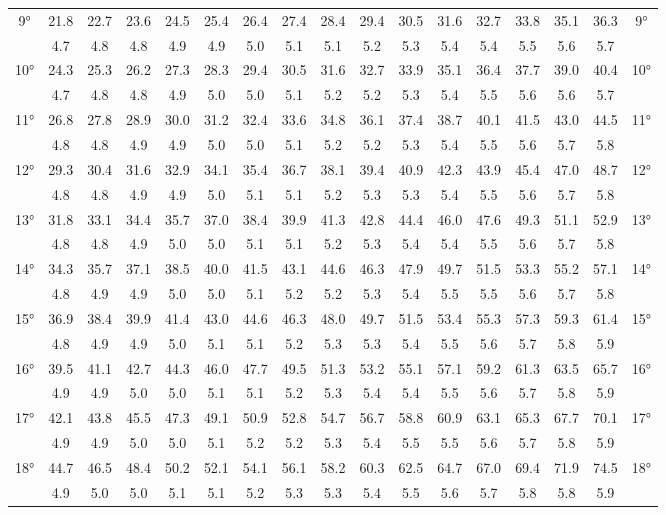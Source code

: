 \begin{footnotesize}
\begin{tabular}{c || c | c | c | c | c | c | c | c | c | c | c | c | c | c | c || c}
		\multirow{2}{*}{9°}&21.8&22.7&23.6&24.5&25.4&26.4&27.4&28.4&29.4&30.5&31.6&32.7&33.8&35.1&36.3&\multirow{2}{*}{9°}\\ \space&4.7&4.8&4.8&4.9&4.9&5.0&5.1&5.1&5.2&5.3&5.4&5.4&5.5&5.6&5.7&\space\\\hline
		\multirow{2}{*}{10°}&24.3&25.3&26.2&27.3&28.3&29.4&30.5&31.6&32.7&33.9&35.1&36.4&37.7&39.0&40.4&\multirow{2}{*}{10°}\\ \space&4.7&4.8&4.8&4.9&5.0&5.0&5.1&5.2&5.2&5.3&5.4&5.5&5.6&5.6&5.7&\space\\\hline
		\multirow{2}{*}{11°}&26.8&27.8&28.9&30.0&31.2&32.4&33.6&34.8&36.1&37.4&38.7&40.1&41.5&43.0&44.5&\multirow{2}{*}{11°}\\ \space&4.8&4.8&4.9&4.9&5.0&5.0&5.1&5.2&5.2&5.3&5.4&5.5&5.6&5.7&5.8&\space\\\hline
		\multirow{2}{*}{12°}&29.3&30.4&31.6&32.9&34.1&35.4&36.7&38.1&39.4&40.9&42.3&43.9&45.4&47.0&48.7&\multirow{2}{*}{12°}\\ \space&4.8&4.8&4.9&4.9&5.0&5.1&5.1&5.2&5.3&5.3&5.4&5.5&5.6&5.7&5.8&\space\\\hline
		\multirow{2}{*}{13°}&31.8&33.1&34.4&35.7&37.0&38.4&39.9&41.3&42.8&44.4&46.0&47.6&49.3&51.1&52.9&\multirow{2}{*}{13°}\\ \space&4.8&4.8&4.9&5.0&5.0&5.1&5.1&5.2&5.3&5.4&5.4&5.5&5.6&5.7&5.8&\space\\\hline
		\multirow{2}{*}{14°}&34.3&35.7&37.1&38.5&40.0&41.5&43.1&44.6&46.3&47.9&49.7&51.5&53.3&55.2&57.1&\multirow{2}{*}{14°}\\ \space&4.8&4.9&4.9&5.0&5.0&5.1&5.2&5.2&5.3&5.4&5.5&5.5&5.6&5.7&5.8&\space\\\hline
		\multirow{2}{*}{15°}&36.9&38.4&39.9&41.4&43.0&44.6&46.3&48.0&49.7&51.5&53.4&55.3&57.3&59.3&61.4&\multirow{2}{*}{15°}\\ \space&4.8&4.9&4.9&5.0&5.1&5.1&5.2&5.3&5.3&5.4&5.5&5.6&5.7&5.8&5.9&\space\\\hline
		\multirow{2}{*}{16°}&39.5&41.1&42.7&44.3&46.0&47.7&49.5&51.3&53.2&55.1&57.1&59.2&61.3&63.5&65.7&\multirow{2}{*}{16°}\\ \space&4.9&4.9&5.0&5.0&5.1&5.1&5.2&5.3&5.4&5.4&5.5&5.6&5.7&5.8&5.9&\space\\\hline
		\multirow{2}{*}{17°}&42.1&43.8&45.5&47.3&49.1&50.9&52.8&54.7&56.7&58.8&60.9&63.1&65.3&67.7&70.1&\multirow{2}{*}{17°}\\ \space&4.9&4.9&5.0&5.0&5.1&5.2&5.2&5.3&5.4&5.5&5.5&5.6&5.7&5.8&5.9&\space\\\hline
		\multirow{2}{*}{18°}&44.7&46.5&48.4&50.2&52.1&54.1&56.1&58.2&60.3&62.5&64.7&67.0&69.4&71.9&74.5&\multirow{2}{*}{18°}\\ \space&4.9&5.0&5.0&5.1&5.1&5.2&5.3&5.3&5.4&5.5&5.6&5.7&5.8&5.8&5.9&\space\\\hline

\end{tabular}
\end{footnotesize}
